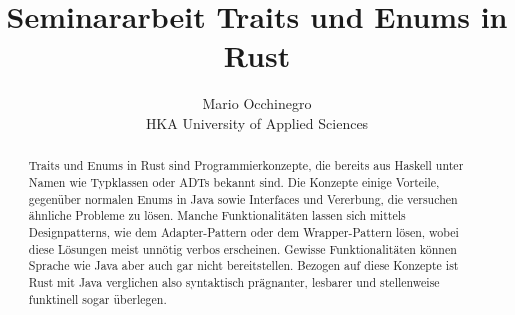 \documentclass[a4paper, 1ppt]{article}
\title{Seminararbeit Traits und Enums in Rust}
\date{}
\author{Mario Occhinegro\\HKA University of Applied Sciences}
\begin{document}
\maketitle
\newpage
\clearpage
\tableofcontents
\setcounter{page}{1}
\newpage
{}
\maketitle
\begin{abstract}
Traits und Enums in Rust sind Programmierkonzepte, die bereits aus Haskell unter Namen wie Typklassen oder ADTs bekannt sind. Die Konzepte einige Vorteile, gegenüber normalen Enums in Java sowie Interfaces und Vererbung, die versuchen ähnliche Probleme zu lösen.
Manche Funktionalitäten lassen sich mittels Designpatterns, wie dem Adapter-Pattern oder dem Wrapper-Pattern  lösen, wobei diese Lösungen meist unnötig verbos erscheinen. Gewisse Funktionalitäten können Sprache wie Java aber auch gar nicht bereitstellen.
Bezogen auf diese Konzepte ist Rust mit Java verglichen also syntaktisch prägnanter, lesbarer und stellenweise funktinell sogar überlegen.
\end{abstract}
\end{document}
